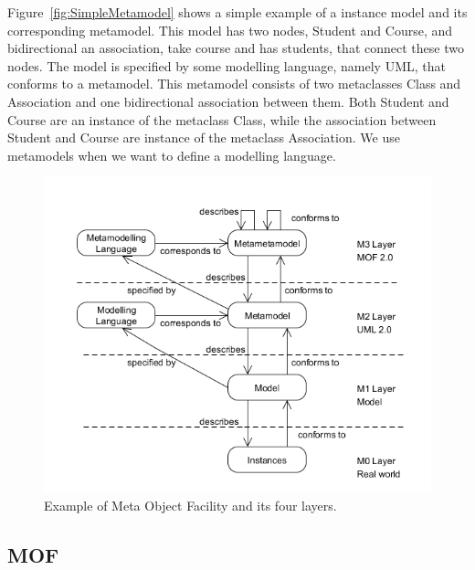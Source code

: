 Figure~\ref{fig:SimpleMetamodel} shows a simple example of a instance model and
its corresponding metamodel. This model has two nodes, Student and Course, and
bidirectional an association, take course and has students, that connect these
two nodes. The model is specified by some modelling language, namely
UML\cite{UML}, that conforms to a metamodel. This metamodel consists of two
metaclasses Class and Association and one bidirectional association between
them. Both Student and Course are an instance of the metaclass Class, while the
association between Student and Course are instance of the metaclass
Association. We use metamodels when we want to define a modelling language.

\begin{figure}[H]
	\centering
	\includegraphics[scale=0.6]{./Figures/MOFLayers.png}
	\caption[Meta Object Facility]
	{Example of Meta Object Facility and its four layers.}
	\label{fig:MOFLayers}
\end{figure}




\subsection{MOF}



